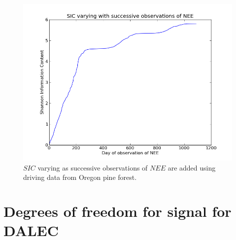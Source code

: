 \documentclass[11pt]{article}
\begin{document}
\begin{figure}[ht]
\centering
\includegraphics[width=.9\textwidth]{SIC_0_1090.png}
\caption{$SIC$ varying as successive observations of $NEE$ are added using driving data from Oregon pine forest.}
\label{SIC_succ}
\end{figure} 





\section{Degrees of freedom for signal for DALEC}
\end{document}
